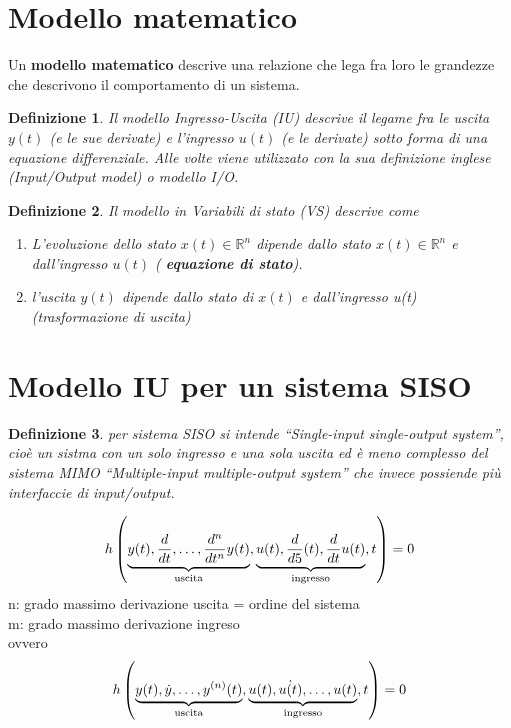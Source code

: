 \documentclass{book}
\newtheorem{defi}{Definizione}
\begin{document}
\section{Modello matematico}
Un \textbf{modello matematico} descrive una relazione che lega fra loro le grandezze che
descrivono il comportamento di un sistema.
\begin{defi}
  Il modello Ingresso-Uscita (IU) descrive il legame fra le uscita $y(t)$ (e le sue derivate) e
  l'ingresso $u(t)$ (e le derivate) sotto forma di una equazione differenziale. Alle volte viene
  utilizzato con la sua definizione inglese (Input/Output model) o modello I/O.
\end{defi}
\begin{defi}
  Il modello in Variabili di stato (VS) descrive come
  \begin{enumerate}
  \item L'evoluzione dello stato $x(t)\in \mathds{R}^n$ dipende dallo stato $x(t)\in \mathds{R}^n$ e dall'ingresso $u(t)$ ({\bf \color{red} equazione di stato}).
    \item l'uscita $y(t)$ dipende dallo stato di $x(t)$ e dall'ingresso u(t)
      (trasformazione di uscita)
    \end{enumerate}
  \end{defi}
  \section{Modello IU per un sistema SISO}
  \begin{defi}
    per sistema SISO si intende ``Single-input single-output system'', cioè un sistma con un solo
    ingresso e una sola uscita ed è meno complesso del sistema MIMO ``Multiple-input multiple-output system'' che invece possiende più interfaccie di input/output.
  \end{defi}
  
  \begin{equation*}
    h\left(\underbrace{y(t),\frac{d}{dt},\dots,\frac{d^n}{dt^n}y(t)}_{\text{\shortstack{uscita}}}, \underbrace{u(t),\frac{d}{d5}(t),\frac{d}{dt}u(t)}_{\text{\shortstack{ingresso}}}, t\right)=0
  \end{equation*}
  n: grado massimo derivazione uscita = ordine del sistema\\
  m: grado massimo derivazione ingreso\\
  ovvero 
  \begin{equation*}
    h\left(\underbrace{y(t),\dot{y},\dots,y^{(n)}(t)}_{\text{\shortstack{uscita}}}, \underbrace{u(t),\dot{u(t)},\dots,u(t)}_{\text{\shortstack{ingresso}}},t\right)=0
  \end{equation*}
\end{document}
